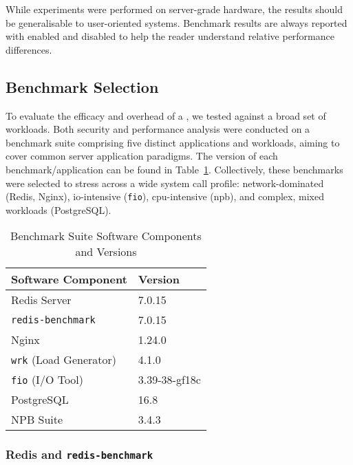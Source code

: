 While experiments were performed on server-grade hardware, the results should be
generalisable to user-oriented systems. Benchmark results are always reported
with \af enabled and disabled to help the reader understand relative
performance differences.

\subsection{Benchmark Selection}\label{subsec:benchmark-selection}

To evaluate the efficacy and overhead of a \af, we tested against a broad set
of workloads. Both security and performance analysis were conducted on a 
benchmark suite comprising five distinct applications and workloads,
aiming to cover common server application paradigms. The version of each
benchmark/application can be found in 
Table~\ref{tab:benchmark_software_versions}. Collectively, these benchmarks were
selected to stress \af across a wide system call profile: network-dominated 
(Redis, Nginx), \ac{io}-intensive (\texttt{fio}), \ac{cpu}-intensive 
(\ac{npb}), and complex, mixed workloads (PostgreSQL).

\begin{table}[h] 
    \centering 
    \caption{Benchmark Suite Software Components and Versions}
    \label{tab:benchmark_software_versions}
    \begin{tabular}{@{}ll@{}} %
        \toprule
        Software Component    & Version \\
        \midrule
        Redis Server          & 7.0.15 \\
        \texttt{redis-benchmark} & 7.0.15 \\
        Nginx                 & 1.24.0 \\
        \texttt{wrk} (Load Generator) & 4.1.0 \\ %
        \texttt{fio} (I/O Tool) & 3.39-38-gf18c \\ %
        PostgreSQL            & 16.8 \\
        NPB Suite             & 3.4.3 \\ %
        \bottomrule
    \end{tabular}
\end{table}

\subsubsection{Redis and \texttt{redis-benchmark}}\label{subsubsec:redis-just}

